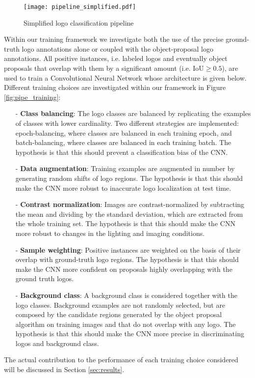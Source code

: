 \documentclass[final,5p,twocolumn]{elsarticle}
\begin{document}
\begin{figure*}[htbp]
	\texttt{[image: pipeline\_simplified.pdf]}
	\centering
	\caption{Simplified logo classification pipeline}
	\label{fig:pipeline_simplified}
\end{figure*}



Within our training framework we investigate both the use of the precise ground-truth logo annotations alone or coupled with the object-proposal logo annotations.
All positive instances, i.e. labeled logos and eventually object proposals that overlap with them by a significant amount (i.e.  IoU$\geq 0.5$), are used to train a Convolutional Neural Network whose architecture is given below.
Different training choices are investigated within our framework in Figure \ref{fig:pipe_training}: 

\begin{itemize}
\item[-] {\bf{Class balancing}}: The logo classes are balanced by replicating the examples of classes with lower cardinality. Two different strategies are implemented: epoch-balancing, where classes are balanced in each training epoch, and batch-balancing, where classes are balanced in each training batch. The hypothesis is that this should prevent a classification bias of the CNN.
\item[-] {\bf{Data augmentation}}: Training examples are augmented in number by generating random shifts of logo regions. The hypothesis is that this should make the CNN more robust to inaccurate logo localization at test time.
\item[-] {\bf{Contrast normalization}}: Images are contrast-normalized by subtracting the mean and dividing by the standard deviation, which are extracted from the whole training set. The hypothesis is that this should make the CNN more robust to changes in the lighting and imaging conditions.
\item[-] {\bf{Sample weighting}}: Positive instances are weighted on the basis of their overlap with ground-truth logo regions. The hypothesis is that this should make the CNN more confident on proposals highly overlapping with the ground truth logos.
\item[-] {\bf{Background class}}: A background class is considered together with the logo classes.
Background examples are not randomly selected, but are composed by the candidate regions generated by the object proposal algorithm on training images and that do not overlap with any logo. The hypothesis is that this should make the CNN more precise in discriminating logos and background class. \end{itemize}
The actual contribution to the performance of each training choice considered will be discussed in Section \ref{sec:results}.
\end{document}
